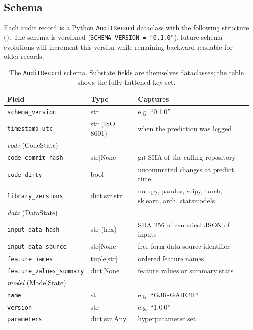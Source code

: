 \subsection{Schema}\label{sec:schema}

Each audit record is a Python \texttt{AuditRecord} dataclass with the following structure (). The schema is versioned (\texttt{SCHEMA\_VERSION = "0.1.0"}); future schema evolutions will increment this version while remaining backward-readable for older records.

\begin{table}[H]
\centering
\caption{The \texttt{AuditRecord} schema. Substate fields are themselves dataclasses; the table shows the fully-flattened key set.}\label{tab:schema}
\scriptsize
\setlength{\tabcolsep}{4pt}
\begin{tabular}{@{}p{4.7cm}p{2.6cm}p{7.1cm}@{}}
\toprule
Field & Type & Captures \\
\midrule
\texttt{schema\_version} & str & e.g. ``0.1.0'' \\
\texttt{timestamp\_utc} & str (ISO 8601) & when the prediction was logged \\
\midrule
\multicolumn{3}{l}{\textit{code} (CodeState)} \\
\quad \texttt{code\_commit\_hash} & str|None & git SHA of the calling repository \\
\quad \texttt{code\_dirty} & bool & uncommitted changes at predict time \\
\quad \texttt{library\_versions} & dict[str,str] & numpy, pandas, scipy, torch, sklearn, arch, statsmodels \\
\midrule
\multicolumn{3}{l}{\textit{data} (DataState)} \\
\quad \texttt{input\_data\_hash} & str (hex) & SHA-256 of canonical-JSON of inputs \\
\quad \texttt{input\_data\_source} & str|None & free-form data source identifier \\
\quad \texttt{feature\_names} & tuple[str] & ordered feature names \\
\quad \texttt{feature\_values\_summary} & dict|None & feature values or summary stats \\
\midrule
\multicolumn{3}{l}{\textit{model} (ModelState)} \\
\quad \texttt{name} & str & e.g. ``GJR-GARCH'' \\
\quad \texttt{version} & str & e.g. ``1.0.0'' \\
\quad \texttt{parameters} & dict[str,Any] & hyperparameter set \\

\end{tabular}
\end{table}

